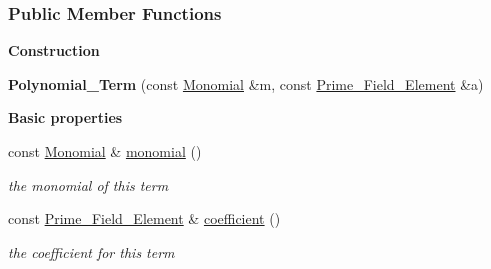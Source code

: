 \subsubsection*{Public Member Functions}
\begin{Indent}\textbf{ Construction}\par
\begin{DoxyCompactItemize}
\item 
\mbox{\label{group___iterator_group_a62dc1c5f38a989c0bfe40520ebc76d74}} 
{\bfseries Polynomial\+\_\+\+Term} (const \hyperlink{group__polygroup_class_monomial}{Monomial} \&m, const \hyperlink{group___fields_group_class_prime___field___element}{Prime\+\_\+\+Field\+\_\+\+Element} \&a)
\end{DoxyCompactItemize}
\end{Indent}
\begin{Indent}\textbf{ Basic properties}\par
\begin{DoxyCompactItemize}
\item 
\mbox{\label{group___iterator_group_aeca1117b51f1326a8c4db38837c84f61}} 
const \hyperlink{group__polygroup_class_monomial}{Monomial} \& \hyperlink{group___iterator_group_aeca1117b51f1326a8c4db38837c84f61}{monomial} ()
\begin{DoxyCompactList}\small\item\em the monomial of this term \end{DoxyCompactList}\item 
\mbox{\label{group___iterator_group_afc61ecc1cd633fd0f758bace614711d1}} 
const \hyperlink{group___fields_group_class_prime___field___element}{Prime\+\_\+\+Field\+\_\+\+Element} \& \hyperlink{group___iterator_group_afc61ecc1cd633fd0f758bace614711d1}{coefficient} ()
\begin{DoxyCompactList}\small\item\em the coefficient for this term \end{DoxyCompactList}\end{DoxyCompactItemize}
\end{Indent}
